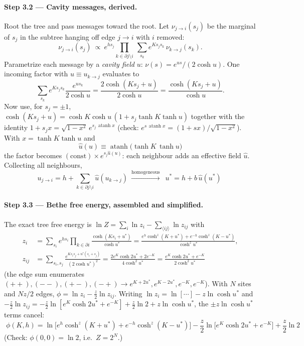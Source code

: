 \documentclass[11pt]{article}
\newcommand{\atanh}{\operatorname{atanh}}
\begin{document}
\paragraph{Step 3.2 --- Cavity messages, derived.}
Root the tree and pass messages toward the root. Let $\nu_{j\to i}(s_j)$ be the marginal of $s_j$ in
the subtree hanging off edge $j\!\to\!i$ with $i$ removed:
\begin{equation}
\nu_{j\to i}(s_j)\ \propto\ e^{h s_j}\!\!\prod_{k\in\partial j\setminus i}\ \sum_{s_k}e^{K s_js_k}\,\nu_{k\to j}(s_k).
\end{equation}
Parametrize each message by a \emph{cavity field} $u$: $\nu(s)=e^{us}/(2\cosh u)$. One incoming
factor with $u\equiv u_{k\to j}$ evaluates to
\begin{equation}
\sum_{s_k}e^{Ks_js_k}\frac{e^{us_k}}{2\cosh u}
=\frac{2\cosh(Ks_j+u)}{2\cosh u}=\frac{\cosh(Ks_j+u)}{\cosh u}.
\end{equation}
Now use, for $s_j=\pm1$, $\cosh(Ks_j+u)=\cosh K\cosh u\,(1+s_j\tanh K\tanh u)$ together with the
identity $1+s_j x=\sqrt{1-x^2}\,e^{s_j\,\atanh x}$ (check:
$e^{s\,\atanh x}=(1+sx)/\sqrt{1-x^2}$). With $x=\tanh K\tanh u$ and
\begin{equation}
\boxed{\;\hat u(u)\equiv\atanh\!\big(\tanh K\,\tanh u\big)\;}
\end{equation}
the factor becomes $(\text{const})\times e^{s_j\hat u(u)}$: each neighbour adds an effective field
$\hat u$. Collecting all neighbours,
\begin{equation}
u_{j\to i}=h+\!\!\sum_{k\in\partial j\setminus i}\!\hat u(u_{k\to j})
\ \xrightarrow{\text{homogeneous}}\
\boxed{\;u^*=h+b\,\hat u(u^*)\;}
\tag{4}\label{eq:fp}
\end{equation}

\paragraph{Step 3.3 --- Bethe free energy, assembled and simplified.}
The exact tree free energy is $\ln Z=\sum_i\ln z_i-\sum_{\langle ij\rangle}\ln z_{ij}$ with
\begin{align}
z_i&=\sum_{s_i}e^{hs_i}\prod_{k\in\partial i}\frac{\cosh(Ks_i+u^*)}{\cosh u^*}
=\frac{e^{h}\cosh^{z}(K{+}u^*)+e^{-h}\cosh^{z}(K{-}u^*)}{\cosh^{z}u^*},\\[2pt]
z_{ij}&=\sum_{s_i,s_j}\frac{e^{Ks_is_j+u^*(s_i+s_j)}}{(2\cosh u^*)^2}
=\frac{2e^{K}\cosh2u^*+2e^{-K}}{4\cosh^{2}u^*}
=\frac{e^{K}\cosh2u^*+e^{-K}}{2\cosh^{2}u^*}
\end{align}
(the edge sum enumerates $(++),(--),(+-),(-+)\to e^{K+2u^*},e^{K-2u^*},e^{-K},e^{-K}$). With $N$
sites and $Nz/2$ edges, $\phi=\ln z_i-\tfrac z2\ln z_{ij}$. Writing $\ln z_i=\ln[\cdots]-z\ln\cosh u^*$
and $-\tfrac z2\ln z_{ij}=-\tfrac z2\ln[e^K\cosh2u^*+e^{-K}]+\tfrac z2\ln2+z\ln\cosh u^*$, the
$\pm z\ln\cosh u^*$ terms cancel:
\begin{equation}
\boxed{\;\phi(K,h)=\ln\!\Big[e^{h}\cosh^{z}(K{+}u^*)+e^{-h}\cosh^{z}(K{-}u^*)\Big]
-\frac z2\ln\!\big[e^{K}\cosh2u^*+e^{-K}\big]+\frac z2\ln 2\;}
\tag{5}\label{eq:phi}
\end{equation}
(Check: $\phi(0,0)=\ln2$, i.e.\ $Z=2^N$.)
\end{document}
